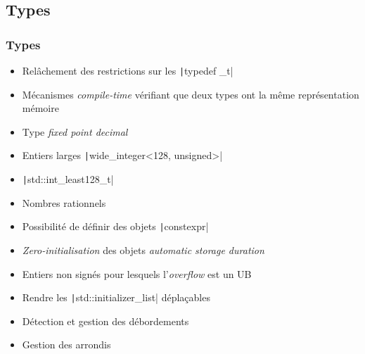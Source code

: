 \documentclass[C++.tex]{subfiles}
\begin{document}
\subsection*{Types}
\begin{frame}[fragile]
	\frametitle{Types}
	\begin{itemize}
		\item Relâchement des restrictions sur les \texttt|typedef _t|
		\item Mécanismes \textit{compile-time} vérifiant que deux types ont la même représentation mémoire
		\item Type \og{}\textit{fixed point decimal}\fg{}
		\item Entiers larges \texttt|wide_integer<128, unsigned>|
		\item \texttt|std::int_least128_t|
		\item Nombres rationnels
		\item Possibilité de définir des objets \texttt|constexpr|
		\item \textit{Zero-initialisation} des objets \textit{automatic storage duration}
		\item Entiers non signés pour lesquels l'\textit{overflow} est un UB
		\item Rendre les \texttt|std::initializer_list| déplaçables
		\item Détection et gestion des débordements
		\item Gestion des arrondis
	\end{itemize}

\end{frame}
\end{document}
